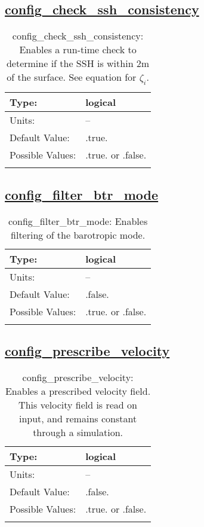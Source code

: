 \subsection[config\_check\_ssh\_consistency]{\hyperref[sec:nm_tab_debug]{config\_check\_ssh\_consistency}}
\label{subsec:nm_sec_config_check_ssh_consistency}
\begin{center}
\begin{longtable}{| p{2.0in} || p{4.0in} |}
    \hline
    Type: & logical \\
    \hline
    Units: & -- \\
    \hline
    Default Value: & .true. \\
    \hline
    Possible Values: & .true. or .false. \\
    \hline
    \caption{config\_check\_ssh\_consistency: Enables a run-time check to determine if the SSH is within 2m of the surface.  See equation for $\zeta_i$.}
\end{longtable}
\end{center}
\subsection[config\_filter\_btr\_mode]{\hyperref[sec:nm_tab_debug]{config\_filter\_btr\_mode}}
\label{subsec:nm_sec_config_filter_btr_mode}
\begin{center}
\begin{longtable}{| p{2.0in} || p{4.0in} |}
    \hline
    Type: & logical \\
    \hline
    Units: & -- \\
    \hline
    Default Value: & .false. \\
    \hline
    Possible Values: & .true. or .false. \\
    \hline
    \caption{config\_filter\_btr\_mode: Enables filtering of the barotropic mode.}
\end{longtable}
\end{center}
\subsection[config\_prescribe\_velocity]{\hyperref[sec:nm_tab_debug]{config\_prescribe\_velocity}}
\label{subsec:nm_sec_config_prescribe_velocity}
\begin{center}
\begin{longtable}{| p{2.0in} || p{4.0in} |}
    \hline
    Type: & logical \\
    \hline
    Units: & -- \\
    \hline
    Default Value: & .false. \\
    \hline
    Possible Values: & .true. or .false. \\
    \hline
    \caption{config\_prescribe\_velocity: Enables a prescribed velocity field. This velocity field is read on input, and remains constant through a simulation.}
\end{longtable}
\end{center}
